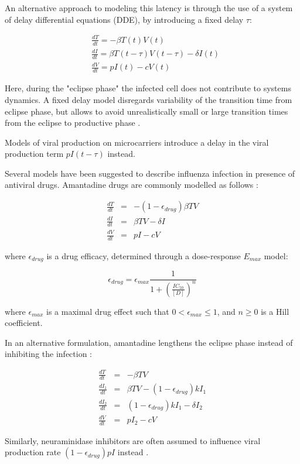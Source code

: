 An alternative approach to modeling this latency is through the use of a system of delay differential equations (DDE), by introducing a fixed delay $\tau$:

\begin{equation}
\begin{array}{rcl}
&\frac{dT}{dt} = - \beta T(t) V(t) \\
&\frac{dI}{dt} = \beta T(t-\tau) V(t-\tau) - \delta I(t) \\
&\frac{dV}{dt} = p I(t) - c V(t)
\end{array}
\end{equation}

Here, during the "eclipse phase" the infected cell does not contribute to systems dynamics. A fixed delay model disregards variability of the transition time from eclipse phase, but allows to avoid unrealistically small or large transition times from the eclipse to productive phase \cite{beauchemin2008modeling}.

Models of viral production on microcarriers \cite{mohler2005mathematical,schulze2009infection} introduce a delay in the viral production term $p I(t - \tau)$ instead.

Several models have been suggested to describe influenza infection in presence of antiviral drugs. Amantadine drugs are commonly modelled as follows \cite{beauchemin2008modeling}:

\begin{equation}
\begin{array}{rcl}
\frac{dT}{dt} &=& - (1-\epsilon_{drug})\beta T V \\
\frac{dI}{dt} &=& \beta T V - \delta I \\
\frac{dV}{dt} &=& p I - c V
\end{array}
\end{equation}

where $\epsilon_{drug}$ is a drug efficacy, determined through a dose-response $E_{max}$ model:

\begin{equation}
\epsilon_{drug} = \epsilon_{max}\frac{1}{1 + (\frac{IC_{50}}{[D]})^{n}}
\end{equation}

where $\epsilon_{max}$ is a maximal drug effect such that $0 < \epsilon_{max} \le 1$, and $n \ge 0$ is a Hill coefficient.

In an alternative formulation, amantadine lengthens the eclipse phase instead of inhibiting the infection \cite{beauchemin2008modeling}:

\begin{equation}
\begin{array}{rcl}
\frac{dT}{dt} &=& - \beta T V \\
\frac{dI_1}{dt} &=& \beta T V - (1-\epsilon_{drug}) k I_1 \\
\frac{dI_2}{dt} &=& (1-\epsilon_{drug}) k I_1 - \delta I_2 \\
\frac{dV}{dt} &=& p I_2 - c V
\end{array}
\end{equation}

Similarly, neuraminidase inhibitors are often assumed to influence viral production rate $(1-\epsilon_{drug}) p I$ instead \cite{handel2007neuraminidase}.